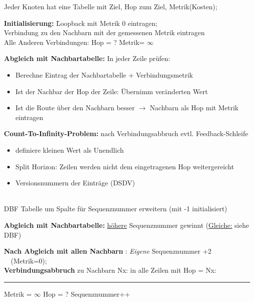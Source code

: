Jeder Knoten hat eine Tabelle mit Ziel, Hop zum Ziel, Metrik(Kosten);\\
\begin{minipage}{0.5\textwidth}
\begin{tabbing}
\textbf{Initialisierung:} \= Loopback mit Metrik 0 eintragen;\\
\> Verbindung zu den Nachbarn mit der gemessenen Metrik eintragen\\
\> Alle Anderen Verbindungen: Hop = ? Metrik= $\infty$
\end{tabbing}
\end{minipage}

\textbf{Abgleich mit Nachbartabelle:} In jeder Zeile prüfen: \\
\begin{minipage}{0.5\textwidth}
\begin{itemize}
\item Berechne Eintrag der Nachbartabelle + Verbindungsmetrik
\item Ist der Nachbar der Hop der Zeile: Übernimm veränderten Wert
\item Ist die Route über den Nachbarn besser $\rightarrow$ Nachbarn als Hop mit Metrik eintragen
\end{itemize}
\end{minipage}

\textbf{Count-To-Infinity-Problem:} nach Verbindungsabbruch evtl. Feedback-Schleife  \\
\begin{minipage}{0.5\textwidth}
\begin{itemize}
\item definiere kleinen Wert als Unendlich
\item Split Horizon: Zeilen werden nicht dem eingetragenen Hop weitergereicht 
\item Versionsnummern der Einträge (DSDV)
\end{itemize}
\end{minipage}\\

DBF Tabelle um Spalte für Sequenznummer erweitern (mit -1 initialisiert)

\textbf{Abgleich mit Nachbartabelle:} \underline{höhere} Sequenznummer gewinnt (\underline{Gleiche:} siehe DBF)

\textbf{Nach Abgleich mit allen Nachbarn} :  \textit{Eigene} Sequenznummer +2 ~~(Metrik=0);\\
\textbf{ Verbindungsabbruch} zu Nachbarn Nx: in alle Zeilen mit Hop = Nx: \\
\rule{1cm}{0pt} Metrik = $\infty$ Hop = ? Sequenznummer++





